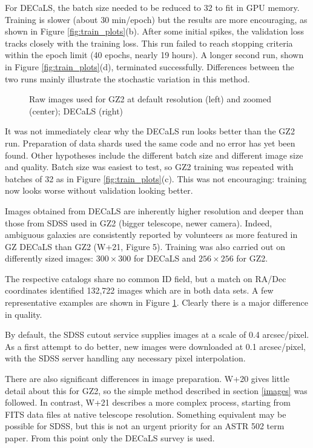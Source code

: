 \documentclass[preprint]{aastex631}
\begin{document}
For DECaLS, the batch size needed to be reduced to 32 to fit in GPU memory. Training is slower (about 30 min/epoch) but the results are more encouraging, as shown in Figure \ref{fig:train_plots}(b). After some initial spikes, the validation loss tracks closely with the training loss. This run failed to reach stopping criteria within the epoch limit (40 epochs, nearly 19 hours). A longer second run, shown in Figure \ref{fig:train_plots}(d), terminated successfully. Differences between the two runs mainly illustrate the stochastic variation in this method.

\begin{figure}[h!]
	\caption{Raw images used for GZ2 at default resolution (left) and zoomed (center); DECaLS (right) \label{fig:images}}
\end{figure}

It was not immediately clear why the DECaLS run looks better than the GZ2 run. Preparation of data shards used the same code and no error has yet been found. Other hypotheses include the different batch size and different image size and quality. Batch size was easiest to test, so GZ2 training was repeated with batches of 32 as in Figure \ref{fig:train_plots}(c). This was not encouraging: training now looks worse without validation looking better.

Images obtained from DECaLS are inherently higher resolution and deeper than those from SDSS used in GZ2 (bigger telescope, newer camera). Indeed, ambiguous galaxies are consistently reported by volunteers as more featured in GZ DECaLS than GZ2 (W+21, Figure 5). Training was also carried out on differently sized images: $300 \times 300$ for DECaLS and $256 \times256$ for GZ2.

The respective catalogs share no common ID field, but a match on RA/Dec coordinates identified 132,722 images which are in both data sets. A few representative examples are shown in Figure \ref{fig:images}. Clearly there is a major difference in quality.

By default, the SDSS cutout service supplies images at a scale of 0.4 arcsec/pixel. As a first attempt to do better, new images were downloaded at 0.1 arcsec/pixel, with the SDSS server handling any necessary pixel interpolation.

There are also significant differences in image preparation. W+20 gives little detail about this for GZ2, so the simple method described in section \ref{images} was followed.  In contrast, W+21 describes a more complex process, starting from FITS data files at native telescope resolution. Something equivalent may be possible for SDSS, but  this is not an urgent priority for an ASTR 502 term paper. From this point only the DECaLS survey is used.
\end{document}

